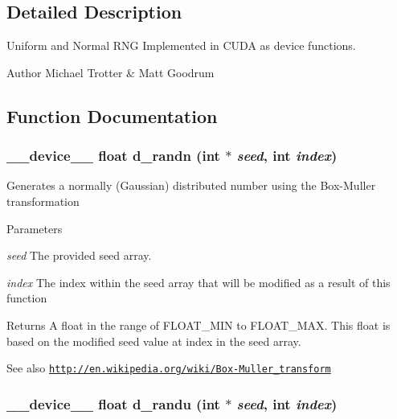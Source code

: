 \subsection{Detailed Description}
Uniform and Normal RNG Implemented in CUDA as device functions. \begin{DoxyAuthor}{Author}
Michael Trotter \& Matt Goodrum 
\end{DoxyAuthor}


\subsection{Function Documentation}
\hypertarget{rng_8cu_ae73ea1d15de0775879be9d0457189f32}{
\subsubsection[{d\_\-randn}]{\setlength{\rightskip}{0pt plus 5cm}\_\-\_\-device\_\-\_\- float d\_\-randn (int $\ast$ {\em seed}, \/  int {\em index})}}
\label{rng_8cu_ae73ea1d15de0775879be9d0457189f32}
Generates a normally (Gaussian) distributed number using the Box-\/Muller transformation 
\begin{DoxyParams}{Parameters}
\item[{\em seed}]The provided seed array. \item[{\em index}]The index within the seed array that will be modified as a result of this function \end{DoxyParams}
\begin{DoxyReturn}{Returns}
A float in the range of FLOAT\_\-MIN to FLOAT\_\-MAX. This float is based on the modified seed value at index in the seed array. 
\end{DoxyReturn}
\begin{DoxySeeAlso}{See also}
\href{http://en.wikipedia.org/wiki/Box-Muller_transform}{\tt http://en.wikipedia.org/wiki/Box-\/Muller\_\-transform} 
\end{DoxySeeAlso}
\hypertarget{rng_8cu_add17ca83d016a5c14fed14c87734ac8c}{
\subsubsection[{d\_\-randu}]{\setlength{\rightskip}{0pt plus 5cm}\_\-\_\-device\_\-\_\- float d\_\-randu (int $\ast$ {\em seed}, \/  int {\em index})}}
\label{rng_8cu_add17ca83d016a5c14fed14c87734ac8c}
